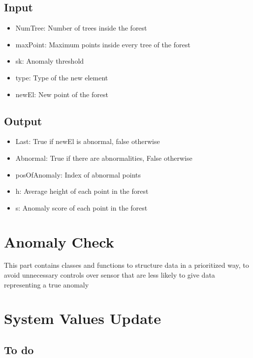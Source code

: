 \documentclass[journal]{IEEEtran}
\begin{document}
\subsection{Input}
\begin{itemize}
\item NumTree: Number of trees inside the forest 
\item maxPoint: Maximum points inside every tree of the forest 
\item sk: Anomaly threshold 
\item type: Type of the new element 
\item newEl: New point of the forest 
\end{itemize}

\subsection{Output}

\begin{itemize}
\item Last: True if newEl is abnormal, false otherwise
\item Abnormal: True if there are abnormalities, False otherwise
\item posOfAnomaly: Index of abnormal points
\item h: Average height of each point in the forest
\item s: Anomaly score of each point in the forest
\end{itemize}


\section{Anomaly Check}
 
This part contains classes and functions to structure data in a prioritized way, 
to avoid unnecessary controls over sensor that are less likely to give data representing a true anomaly

\section{System Values Update}

\subsection{To do}
\end{document}
